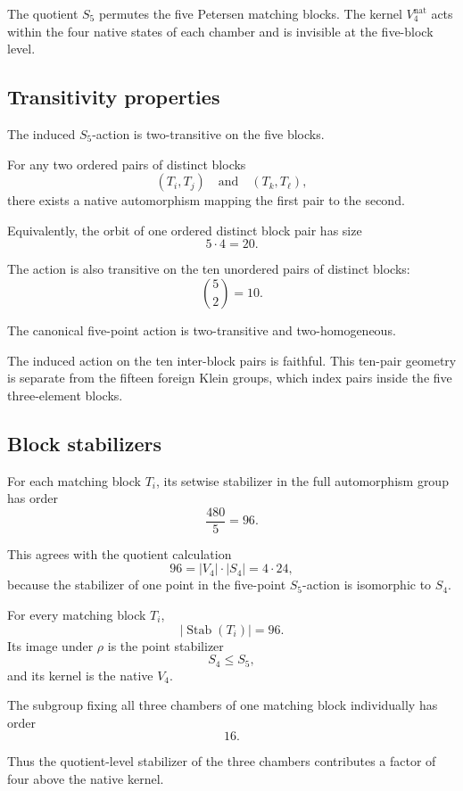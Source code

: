 The quotient \(S_5\) permutes the five Petersen matching blocks. The
kernel \(V_4^{\mathrm{nat}}\) acts within the four native states of
each chamber and is invisible at the five-block level.

\subsection{Transitivity properties}

The induced \(S_5\)-action is two-transitive on the five blocks.

For any two ordered pairs of distinct blocks
\[
(T_i,T_j)
\quad\text{and}\quad
(T_k,T_\ell),
\]
there exists a native automorphism mapping the first pair to the
second.

Equivalently, the orbit of one ordered distinct block pair has size
\[
5\cdot4=20.
\]

The action is also transitive on the ten unordered pairs of distinct
blocks:
\[
\binom52=10.
\]

\begin{proposition}
The canonical five-point action is two-transitive and
two-homogeneous.
\end{proposition}

The induced action on the ten inter-block pairs is faithful. This
ten-pair geometry is separate from the fifteen foreign Klein groups,
which index pairs inside the five three-element blocks.

\subsection{Block stabilizers}

For each matching block \(T_i\), its setwise stabilizer in the full
automorphism group has order
\[
\frac{480}{5}=96.
\]

This agrees with the quotient calculation
\[
96
=
|V_4|\cdot|S_4|
=
4\cdot24,
\]
because the stabilizer of one point in the five-point \(S_5\)-action
is isomorphic to \(S_4\).

\begin{proposition}
For every matching block \(T_i\),
\[
|\operatorname{Stab}(T_i)|=96.
\]
Its image under \(\rho\) is the point stabilizer
\[
S_4\leq S_5,
\]
and its kernel is the native \(V_4\).
\end{proposition}

The subgroup fixing all three chambers of one matching block
individually has order
\[
16.
\]

Thus the quotient-level stabilizer of the three chambers contributes
a factor of four above the native kernel.

